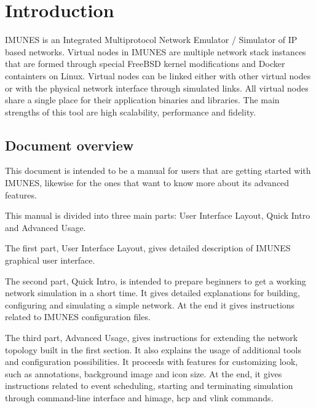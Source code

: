 \chapter{Introduction}
IMUNES is an Integrated Multiprotocol Network Emulator / Simulator of IP based
networks. Virtual nodes in IMUNES are multiple network stack instances that are
formed through special FreeBSD kernel modifications and Docker containters on
Linux. Virtual nodes can be linked either with other virtual nodes or with the
physical network interface through simulated links. All virtual nodes share a
single place for their application binaries and libraries. The main strengths
of this tool are high scalability, performance and fidelity.

\section{Document overview}
This document is intended to be a manual for users that are getting started
with IMUNES, likewise for the ones that want to know more about its advanced
features.

This manual is divided into three main parts: User Interface Layout, Quick
Intro and Advanced Usage. 

The first part, User Interface Layout, gives detailed description of IMUNES
graphical user interface. 

The second part, Quick Intro, is intended to prepare beginners to get a working
network simulation in a short time. It gives detailed explanations for
building, configuring and simulating a simple network. At the end it gives
instructions related to IMUNES configuration files.

The third part, Advanced Usage, gives instructions for extending the network
topology built in the first section. It also explains the usage of additional
tools and configuration possibilities. It proceeds with features for
customizing look, such as annotations, background image and icon size. At the
end, it gives instructions related to event scheduling, starting and
terminating simulation through command-line interface and himage, hcp and vlink
commands.
